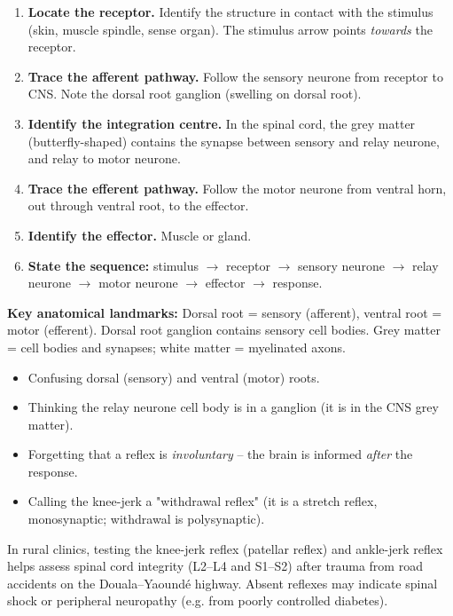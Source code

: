 \documentclass[11pt]{article}
\newcommand{\cle}[1]{{\popxbold\color{popdark}#1}}
\begin{document}
\begin{methode}
\begin{enumerate}
\item \textbf{Locate the receptor.} Identify the structure in contact with the stimulus (skin, muscle spindle, sense organ). The stimulus arrow points \emph{towards} the receptor.
\item \textbf{Trace the afferent pathway.} Follow the sensory neurone from receptor to CNS. Note the dorsal root ganglion (swelling on dorsal root).
\item \textbf{Identify the integration centre.} In the spinal cord, the grey matter (butterfly-shaped) contains the synapse between sensory and relay neurone, and relay to motor neurone.
\item \textbf{Trace the efferent pathway.} Follow the motor neurone from ventral horn, out through ventral root, to the effector.
\item \textbf{Identify the effector.} Muscle or gland.
\item \textbf{State the sequence:} stimulus $\rightarrow$ receptor $\rightarrow$ sensory neurone $\rightarrow$ relay neurone $\rightarrow$ motor neurone $\rightarrow$ effector $\rightarrow$ response.
\end{enumerate}
\textbf{Key anatomical landmarks:} Dorsal root = sensory (afferent), ventral root = motor (efferent). Dorsal root ganglion contains sensory cell bodies. Grey matter = cell bodies and synapses; white matter = myelinated axons.
\end{methode}

\begin{attention}
\begin{itemize}
\item Confusing dorsal (sensory) and ventral (motor) roots.
\item Thinking the relay neurone cell body is in a ganglion (it is in the CNS grey matter).
\item Forgetting that a reflex is \emph{involuntary} -- the brain is informed \emph{after} the response.
\item Calling the knee-jerk a "withdrawal reflex" (it is a \cle{stretch reflex}, monosynaptic; withdrawal is polysynaptic).
\end{itemize}
\end{attention}

\begin{savaistu}
In rural clinics, testing the \cle{knee-jerk reflex} (patellar reflex) and \cle{ankle-jerk reflex} helps assess spinal cord integrity (L2--L4 and S1--S2) after trauma from road accidents on the Douala--Yaound\'e highway. Absent reflexes may indicate spinal shock or peripheral neuropathy (e.g. from poorly controlled diabetes).
\end{savaistu}
\end{document}
